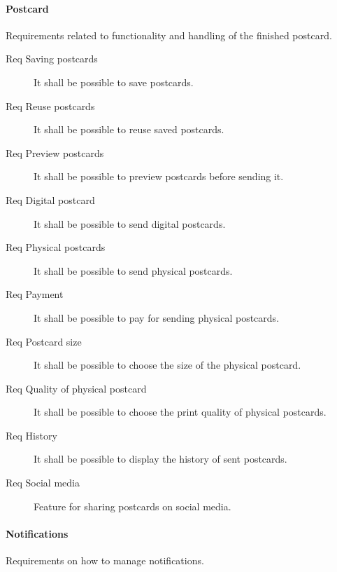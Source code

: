 \documentclass[10pt,a4paper]{article}
\begin{document}
\paragraph{Postcard}
Requirements related to functionality and handling of the finished postcard.

\begin{description}
	\item [Req  Saving postcards] It shall be possible to save postcards.
	\item [Req  Reuse postcards] It shall be possible to reuse saved postcards.
	
	\item [Req  Preview postcards] It shall be possible to preview postcards before sending it.
	
	\item [Req  Digital postcard] It shall be possible to send digital postcards.
	\item [Req  Physical postcards] It shall be possible to send physical postcards.
	
	\item [Req  Payment] It shall be possible to pay for sending physical postcards.
	
	\item [Req  Postcard size] It shall be possible to choose the size of the physical postcard.
	\item [Req  Quality of physical postcard] It shall be possible to choose the print quality of physical postcards. 
	\item [Req  History] It shall be possible to display the history of sent postcards.
	
	\item [Req  Social media] Feature for sharing postcards on social media.
\end{description}

\paragraph{Notifications}
Requirements on how to manage notifications.
\end{document}

